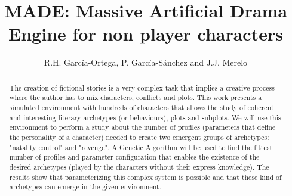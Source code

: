 \documentclass[runningheads]{llncs}
\begin{document}
\mainmatter  %



\title{MADE: Massive Artificial Drama Engine for non player characters}

\author{R.H. Garc\'ia-Ortega, P. Garc\'ia-S\'anchez and J.J. Merelo}

%








\maketitle


\begin{abstract}



The creation of fictional stories is a very complex task that implies a creative process where the author has to mix characters, conflicts and plots. This work presents a simulated environment with hundreds of characters that allows the study of coherent and interesting literary archetypes (or behaviours), plots and subplots. We will use this environment to perform a study about the number of profiles (parameters that define the personality of a character) needed to create two emergent groups of archetypes: "natality control" and "revenge". A Genetic Algorithm will be used to find the fittest number of profiles and parameter configuration that enables the existence of the desired archetypes (played by the characters without their express knowledge). The results show that parameterizing this complex system is possible and that these kind of archetypes can emerge in the given environment.



\end{abstract}
\end{document}
